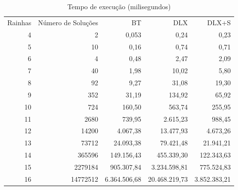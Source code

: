 \documentclass{article}
\begin{document}
\begin{center}
  \begin{table}
  \centering
  \begin{tabular}{ r r r r r }
    Rainhas & Número de Soluções & BT & DLX & DLX+S \\
    4  & 2        & 0,053      & 0,24        & 0,23      \\
    5  & 10       & 0,16       & 0,74        & 0,71      \\
    6  & 4        & 0,48       & 2,47        & 2,09      \\
    7  & 40       & 1,98       & 10,02       & 5,80      \\
    8  & 92       & 9,27       & 31,08       & 19,30     \\
    9  & 352      & 31,19      & 134,92      & 65,92     \\
    10 & 724      & 160,50     & 563,74      & 255,95    \\
    11 & 2680     & 739,95     & 2.615,23     & 988,45    \\
    12 & 14200    & 4.067,38    & 13.477,93    & 4.673,26   \\
    13 & 73712    & 24.093,38   & 79.421,48    & 21.941,21  \\
    14 & 365596   & 149.156,43  & 455.339,30   & 122.343,63 \\
    15 & 2279184  & 905.307,84  & 3.234.598,81  & 775.524,83 \\
    16 & 14772512 & 6.364.506,68 & 20.468.219,73 & 3.852.383,21 \\
  \end{tabular}
  \caption{Tempo de execução (milisegundos)}
  \label{tab:tab_2}
  \end{table}
\end{center}
\end{document}
